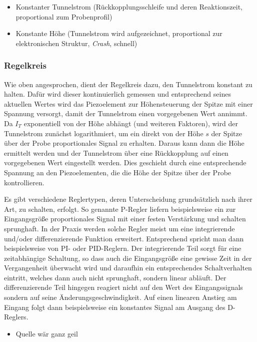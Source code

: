 \documentclass[10pt, a4paper]{article}
\begin{document}
\begin{itemize}
  \item Konstanter Tunnelstrom (Rückkopplungsschleife und deren Reaktionszeit, proportional zum Probenprofil)
  \item Konstante Höhe (Tunnelstrom wird aufgezeichnet, proportional zur elektronischen Struktur, \emph{Crash}, schnell)
\end{itemize}

\subsubsection{Regelkreis}

Wie oben angesprochen, dient der Regelkreis dazu, den Tunnelstrom konstant zu halten.
Dafür wird dieser kontinuierlich gemessen und entsprechend seines aktuellen Wertes wird das Piezoelement zur Höhensteuerung der Spitze mit einer Spannung versorgt, damit der Tunnelstrom einen vorgegebenen Wert annimmt.
Da $I_T$ exponentiell von der Höhe abhängt (und weiteren Faktoren), wird der Tunnelstrom zunächst logarithmiert, um ein direkt von der Höhe $s$ der Spitze über der Probe proportionales Signal zu erhalten.
Daraus kann dann die Höhe ermittelt werden und der Tunnelstrom über eine Rückkopplung auf einen vorgegebenen Wert eingestellt werden. 
Dies geschieht durch eine entsprechende Spannung an den Piezoelementen, die die Höhe der Spitze über der Probe kontrollieren.

Es gibt verschiedene Reglertypen, deren Unterscheidung grundsätzlich nach ihrer Art, zu schalten, erfolgt.
So genannte P-Regler liefern beispielsweise ein zur Eingangsgröße proportionales Signal mit einer festen Verstärkung und schalten sprunghaft.
In der Praxis werden solche Regler meist um eine integrierende und/oder differenzierende Funktion erweitert. Entsprechend spricht man dann beispielsweise von PI- oder PID-Reglern.
Der integrierende Teil sorgt für eine zeitabhängige Schaltung, so dass auch die Eingangsgröße eine gewisse Zeit in der Vergangenheit überwacht wird und daraufhin ein entsprechendes Schaltverhalten eintritt, welches dann auch nicht sprunghaft, sondern linear abläuft.
Der differenzierende Teil hingegen reagiert nicht auf den Wert des Eingangssignals sondern auf seine Änderungsgeschwindigkeit.
Auf einen linearen Anstieg am Eingang folgt dann beispielsweise ein konstantes Signal am Ausgang des D-Reglers.

\begin{itemize}
\item Quelle wär ganz geil
\end{itemize}
\end{document}
